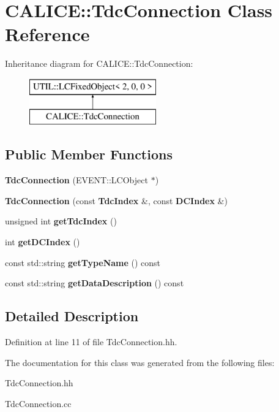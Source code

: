 \section{C\-A\-L\-I\-C\-E\-:\-:Tdc\-Connection Class Reference}
\label{classCALICE_1_1TdcConnection}
Inheritance diagram for C\-A\-L\-I\-C\-E\-:\-:Tdc\-Connection\-:\begin{figure}[H]
\begin{center}
\leavevmode
\includegraphics[height=2.000000cm]{classCALICE_1_1TdcConnection}
\end{center}
\end{figure}
\subsection*{Public Member Functions}
\begin{DoxyCompactItemize}
\item 
{\bfseries Tdc\-Connection} (E\-V\-E\-N\-T\-::\-L\-C\-Object $\ast$)\label{classCALICE_1_1TdcConnection_a94c0e0c33f59e1d9b8198fa4f248bc63}

\item 
{\bfseries Tdc\-Connection} (const {\bf Tdc\-Index} \&, const {\bf D\-C\-Index} \&)\label{classCALICE_1_1TdcConnection_ae48d95c1cdfffc1b30e37f636cba4ee1}

\item 
unsigned int {\bfseries get\-Tdc\-Index} ()\label{classCALICE_1_1TdcConnection_ae5666c4cf9f57bebc75968e6c9e57931}

\item 
int {\bfseries get\-D\-C\-Index} ()\label{classCALICE_1_1TdcConnection_a3cb6ff2b85705a238adb623419b7697f}

\item 
const std\-::string {\bfseries get\-Type\-Name} () const \label{classCALICE_1_1TdcConnection_ad7a9bc4b34f1053cab34962d432be7ea}

\item 
const std\-::string {\bfseries get\-Data\-Description} () const \label{classCALICE_1_1TdcConnection_a6019c3b7b3a649cbb29db10c8ccd1281}

\end{DoxyCompactItemize}


\subsection{Detailed Description}


Definition at line 11 of file Tdc\-Connection.\-hh.



The documentation for this class was generated from the following files\-:\begin{DoxyCompactItemize}
\item 
Tdc\-Connection.\-hh\item 
Tdc\-Connection.\-cc\end{DoxyCompactItemize}
